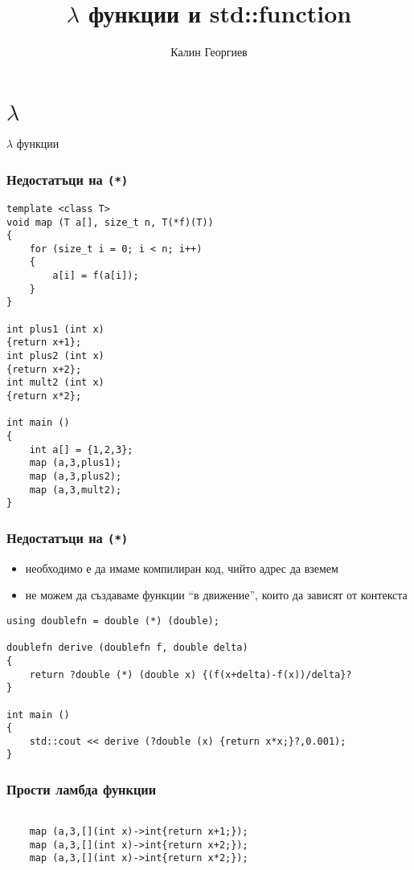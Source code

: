 \documentclass{beamer}
\begin{document}
\title[Обектно ориентирано програмиране]{$\lambda$ функции и std::function}
\author{Калин Георгиев}
\frame{\titlepage}

\section{$\lambda$}


\begin{frame}
    \centerline{$\lambda$ функции}
\end{frame}

\begin{frame}[fragile]
    \frametitle{Недостатъци на \texttt{(*)}}
    
\begin{lstlisting}[basicstyle=\tiny]
template <class T>
void map (T a[], size_t n, T(*f)(T))
{ 
    for (size_t i = 0; i < n; i++)
    {
        a[i] = f(a[i]);
    }
}

int plus1 (int x)
{return x+1};
int plus2 (int x)
{return x+2};
int mult2 (int x)
{return x*2};

int main ()
{
    int a[] = {1,2,3};
    map (a,3,plus1);
    map (a,3,plus2);
    map (a,3,mult2);
}
\end{lstlisting}
\end{frame}



\begin{frame}[fragile]
    \frametitle{Недостатъци на \texttt{(*)}}
    
    \begin{itemize}
        \item необходимо е да имаме компилиран код, чийто адрес да вземем
        \item не можем да създаваме функции ``в движение'', които да зависят от контекста
    \end{itemize}
    
\begin{lstlisting}[basicstyle=\tiny]
using doublefn = double (*) (double);

doublefn derive (doublefn f, double delta)
{ 
    return ?double (*) (double x) {(f(x+delta)-f(x))/delta}?
}

int main ()
{
    std::cout << derive (?double (x) {return x*x;}?,0.001);
}
\end{lstlisting}
\end{frame}
    


\begin{frame}[fragile]
    \frametitle{Прости ламбда функции}
    
\begin{lstlisting}[]

    map (a,3,[](int x)->int{return x+1;});
    map (a,3,[](int x)->int{return x+2;});
    map (a,3,[](int x)->int{return x*2;});

\end{lstlisting}
\end{frame}
\end{document}
